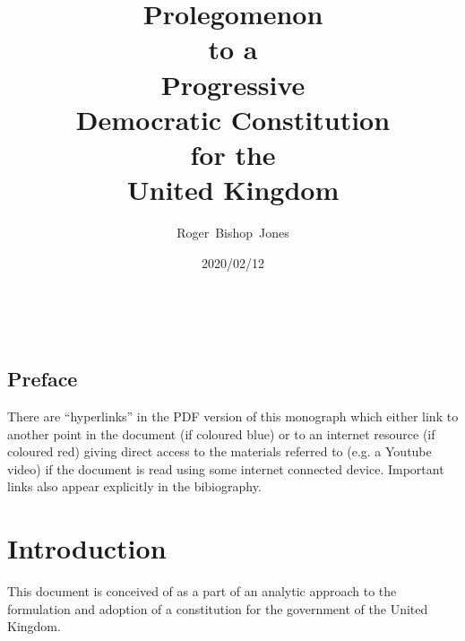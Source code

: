 \documentclass[10pt,titlepage]{book}
\title{\LARGE\bf Prolegomenon \\to a \\Progressive \\Democratic Constitution \\for the \\United Kingdom}
\author{Roger~Bishop~Jones}
\date{\small 2020/02/12}
\newcommand{\ignore}[1]{}
\begin{document}
\frontmatter

                               
\begin{titlepage}
\maketitle





\end{titlepage}

\ \

\ignore{
\begin{centering}
{}
\end{centering}
}%

\setcounter{tocdepth}{2}
{\parskip-0pt\tableofcontents}


\mainmatter

\pagebreak

\section*{Preface}


There are ``hyperlinks'' in the PDF version of this monograph which either link to another point in the document  (if coloured blue) or to an internet resource  (if coloured red) giving direct access to the materials referred to (e.g. a Youtube video) if the document is read using some internet connected device.
Important links also appear explicitly in the bibiography.

\chapter{Introduction}

This document is conceived of as a part of an analytic approach to the formulation and
adoption of a constitution for the government of the United Kingdom.
\end{document}
